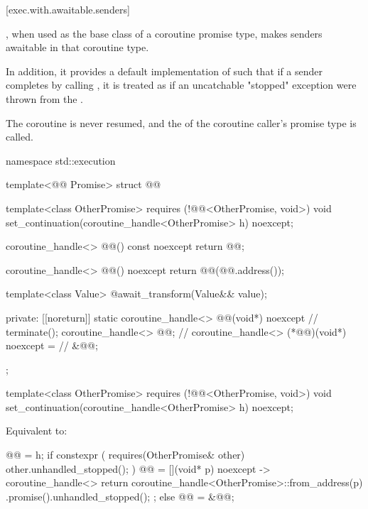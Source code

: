 [exec.with.awaitable.senders]{}

\pnum
{},
when used as the base class of a coroutine promise type,
makes senders awaitable in that coroutine type.

In addition, it provides a default implementation of 
such that if a sender completes by calling ,
it is treated as if an uncatchable "stopped" exception were thrown
from the .
\begin{note}
The coroutine is never resumed, and
the  of the coroutine caller's promise type is called.
\end{note}

\begin{codeblock}
namespace std::execution {
  template<@@ Promise>
    struct @@ {
      template<class OtherPromise>
        requires (!@@<OtherPromise, void>)
      void set_continuation(coroutine_handle<OtherPromise> h) noexcept;

      coroutine_handle<> @@() const noexcept { return @@; }

      coroutine_handle<> @@() noexcept {
        return @@(@@.address());
      }

      template<class Value>
      @\seebelow@ await_transform(Value&& value);

    private:
      [[noreturn]] static coroutine_handle<>
        @@(void*) noexcept {             // \expos
        terminate();
      }
      coroutine_handle<> @@{};                        // \expos
      coroutine_handle<> (*@@)(void*) noexcept =   // \expos
        &@@;
    };
}
\end{codeblock}

%
\begin{itemdecl}
template<class OtherPromise>
  requires (!@@<OtherPromise, void>)
void set_continuation(coroutine_handle<OtherPromise> h) noexcept;
\end{itemdecl}

\begin{itemdescr}
\pnum
\effects
Equivalent to:
\begin{codeblock}
@@ = h;
if constexpr ( requires(OtherPromise& other) { other.unhandled_stopped(); } ) {
  @@ = [](void* p) noexcept -> coroutine_handle<> {
    return coroutine_handle<OtherPromise>::from_address(p)
      .promise().unhandled_stopped();
  };
} else {
  @@ = &@@;
}
\end{codeblock}
\end{itemdescr}

